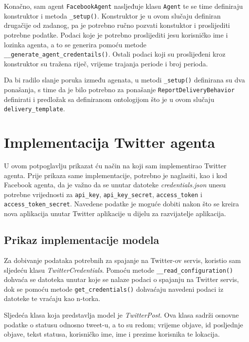 \documentclass[a4paper,12pt]{foi}
\begin{document}
Konačno, sam agent \texttt{FacebookAgent} nasljeđuje klasu \texttt{Agent} te se time definiraju konstruktor i metoda \texttt{\_setup()}. Konstruktor je u ovom slučaju definiran drugačije od zadanog, pa je potrebno ručno pozvati konstuktor i proslijediti potrebne podatke. Podaci koje je potrebno proslijediti jesu korisničko ime i lozinka agenta, a to se generira pomoću metode \texttt{\_\_generate\_agent\_credentails()}. Ostali podaci koji su proslijeđeni kroz konstruktor su tražena riječ, vrijeme trajanja periode i broj perioda.

Da bi radilo slanje poruka između agenata, u metodi \texttt{\_setup()} definirana su dva ponašanja,  s time da je bilo potrebno za ponašanje \texttt{ReportDeliveryBehavior} definirati i predložak sa definiranom ontologijom što je u ovom slučaju \texttt{delivery\_template}.

\section{Implementacija Twitter agenta}

U ovom potpoglavlju prikazat ću način na koji sam implementirao Twitter agenta. Prije prikaza same implementacije, potrebno je naglasiti, kao i kod Facebook agenta, da je važno da se unutar datoteke \textit{credentials.json} unesu potrebne vrijednosti za \texttt{api\_key}, \texttt{api\_key\_secret}, \texttt{access\_token} i \texttt{access\_token\_secret}. Navedene podatke je moguće dobiti nakon što se kreira nova aplikacija unutar Twitter aplikacije u dijelu za razvijatelje aplikacija.

\subsection{Prikaz implementacije modela}

Za dobivanje podataka potrebnih za spajanje na Twitter-ov servis, koristio sam sljedeću klasu \textit{TwitterCredentials}. Pomoću metode \texttt{\_\_read\_configuration()} dohvaća se datoteka unutar koje se nalaze podaci o spajanju na Twitter servis, dok se pomoću metode \texttt{get\_credentials()} dohvaćaju navedeni podaci iz datoteke te vraćaju kao n-torka.

\lstset{commentstyle=\textit,language=python}


Sljedeća klasa koja predstavlja model je \textit{TwitterPost}. Ova klasa sadrži osnovne podatke o statusu odnosno tweet-u, a to su redom; vrijeme objave, id posljednje objave, tekst statusa, korisničko ime, ime i prezime korisnika te lokacija.
\end{document}

